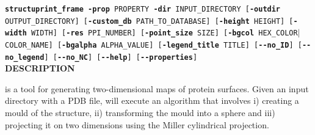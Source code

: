 \documentclass[12pt,a4paper]{article}
\begin{document}
\texttt{\textbf{structuprint\_frame} \textbf{-prop} PROPERTY\newline
\hspace*{3.98cm} \textbf{-dir} INPUT\_DIRECTORY\newline
\hspace*{3.98cm} [\textbf{-outdir} OUTPUT\_DIRECTORY]\newline
\hspace*{3.98cm} [\textbf{-custom\_db} PATH\_TO\_DATABASE]\newline
\hspace*{3.98cm} [\textbf{-height} HEIGHT] [\textbf{-width} WIDTH]\newline
\hspace*{3.98cm} [\textbf{-res} PPI\_NUMBER]\newline
\hspace*{3.98cm} [\textbf{-point\_size} SIZE]\newline
\hspace*{3.98cm} [\textbf{-bgcol} HEX\_COLOR$|$COLOR\_NAME] [\textbf{-bgalpha} ALPHA\_VALUE]\newline
\hspace*{3.98cm} [\textbf{-legend\_title} TITLE]\newline
\hspace*{3.98cm} [\textbf{-{}-no\_ID}] [\textbf{-{}-no\_legend}] [\textbf{-{}-no\_NC}]\newline
\hspace*{3.98cm} [\textbf{-{}-help}]\newline
\hspace*{3.98cm} [\textbf{-{}-properties}]}\\

\textbf{\large{DESCRIPTION}}

 is a tool for generating two-dimensional maps of protein surfaces. Given an input directory with a PDB file,  will execute an algorithm that involves i) creating a mould of the structure, ii) transforming the mould into a sphere and iii) projecting it on two dimensions using the Miller cylindrical projection.\\
\end{document}
